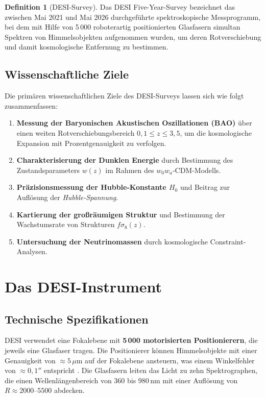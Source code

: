 ﻿\documentclass[a4paper,12pt]{article}
\theoremstyle{definition}
\newtheorem{definition}{Definition}[section]
\theoremstyle{remark}
\begin{document}
\begin{definition}[DESI-Survey]
  Das DESI Five-Year-Survey bezeichnet das zwischen Mai 2021 und Mai 2026
  durchgeführte spektroskopische Messprogramm, bei dem mit Hilfe von
  5\,000 roboterartig positionierten Glasfasern simultan Spektren von
  Himmelsobjekten aufgenommen wurden, um deren Rotverschiebung und damit
  kosmologische Entfernung zu bestimmen.
\end{definition}

\subsection{Wissenschaftliche Ziele}

Die primären wissenschaftlichen Ziele des DESI-Surveys lassen sich wie folgt
zusammenfassen:

\begin{enumerate}[label=\arabic*.]
  \item \textbf{Messung der Baryonischen Akustischen Oszillationen (BAO)} über
    einen weiten Rotverschiebungsbereich $0{,}1 \leq z \leq 3{,}5$, um die
    kosmologische Expansion mit Prozentgenauigkeit zu verfolgen.
  \item \textbf{Charakterisierung der Dunklen Energie} durch Bestimmung des
    Zustandsparameters $w(z)$ im Rahmen des $w_0 w_a$-CDM-Modells.
  \item \textbf{Präzisionsmessung der Hubble-Konstante $H_0$} und Beitrag zur
    Auflösung der \textit{Hubble-Spannung}.
  \item \textbf{Kartierung der großräumigen Struktur} und Bestimmung der
    Wachstumsrate von Strukturen $f\sigma_8(z)$.
  \item \textbf{Untersuchung der Neutrinomassen} durch kosmologische Constraint-Analysen.
\end{enumerate}

\section{Das DESI-Instrument}
\label{sec:instrument}

\subsection{Technische Spezifikationen}

DESI verwendet eine Fokalebene mit \textbf{5\,000 motorisierten Positionierern},
die jeweils eine Glasfaser tragen. Die Positionierer können Himmelsobjekte mit
einer Genauigkeit von $\approx 5\,\mu$m auf der Fokalebene ansteuern, was einem
Winkelfehler von $\approx 0{,}1''$ entspricht \cite{desi2016}. Die Glasfasern
leiten das Licht zu zehn Spektrographen, die einen Wellenlängenbereich von
360 bis 980\,nm mit einer Auflösung von $R \approx 2000$--$5500$ abdecken.
\end{document}
